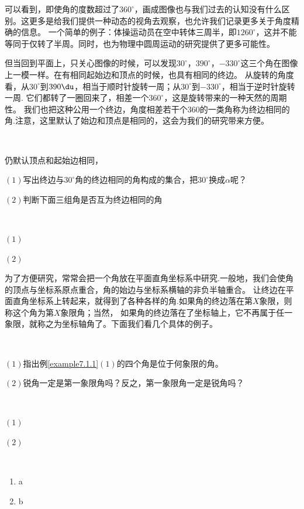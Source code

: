 可以看到，即使角的度数超过了$360^\circ$，画成图像也与我们过去的认知没有什么区别。这更多是给我们提供一种动态的视角去观察，也允许我们记录更多关于角度精确的信息。
一个简单的例子：体操运动员在空中转体三周半，即$1260^\circ$，这并不能等同于仅转了半周。同时，也为物理中圆周运动的研究提供了更多可能性。

但当回到平面上，只关心图像的时候，可以发现$30^\circ$，$390^\circ$，$-330^\circ$这三个角在图像上一模一样。在有相同起始边和顶点的时候，也具有相同的终边。
从旋转的角度看，从$30^\circ$到$390\du$，相当于顺时针旋转一周；从$30^\circ$到$-330^\circ$，相当于逆时针旋转一周.
它们都转了一圈回来了，相差一个$360^\circ$，这是旋转带来的一种天然的周期性。
我们也把这种公用一个终边，角度相差若干个$360$的一类角称为终边相同的角.注意，这里默认了始边和顶点是相同的，这会为我们的研究带来方便。
\begin{example}
    \ 

仍默认顶点和起始边相同，

    $(1)$写出终边与$30^\circ$角的终边相同的角构成的集合，把$30^\circ$换成$\alpha$呢？

    $(2)$判断下面三组角是否互为终边相同的角
\end{example}
\begin{jie}
    \ 
    
    $(1)$

    $(2)$


\end{jie}

为了方便研究，常常会把一个角放在平面直角坐标系中研究.一般地，我们会使角的顶点与坐标系原点重合，角的始边与坐标系横轴的非负半轴重合。
让终边在平面直角坐标系上转起来，就得到了各种各样的角.如果角的终边落在第$X$象限，则称这个角为第$X$象限角；当然，
如果角的终边落在了坐标轴上，它不再属于任一象限，就称之为坐标轴角了。下面我们看几个具体的例子。
\begin{example}
    \ 
    
    $(1)$指出例\ref{example7.1.1}$(1)$的四个角是位于何象限的角。

    $(2)$锐角一定是第一象限角吗？反之，第一象限角一定是锐角吗？
\end{example}
\begin{jie}
    \ 

    $(1)$

    $(2)$
\end{jie}

\begin{example}
    \ 

    \begin{enumerate}[(1)]
        \item a
        \item b
    \end{enumerate}

\end{example}


